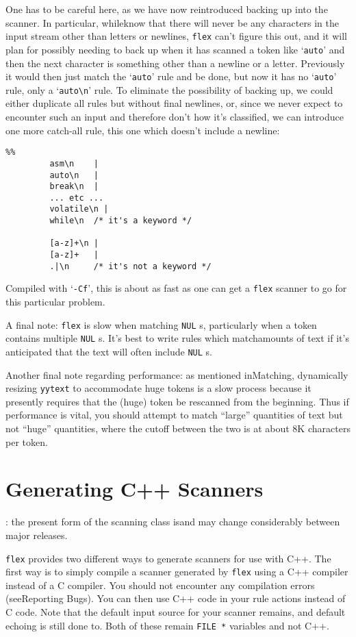 \documentclass[openany,oneside]{book}
\begin{document}
One has to be careful here, as we have now reintroduced backing up
into the scanner.  In particular, whileknow that there will never be any characters in the input stream
other than letters or newlines, \verb`flex` can't figure this out, and it will plan for possibly needing to back up
when it has scanned a token like ‘\verb`auto`’ and then the next character
is something other than a newline or a letter.  Previously it would
then just match the ‘\verb`auto`’ rule and be done, but now it has no ‘\verb`auto`’
rule, only a ‘\verb`auto\n`’ rule.  To eliminate the possibility of backing up,
we could either duplicate all rules but without final newlines, or,
since we never expect to encounter such an input and therefore don't
how it's classified, we can introduce one more catch-all rule, this
one which doesn't include a newline:
\begin{verbatim}
%%
         asm\n    |
         auto\n   |
         break\n  |
         ... etc ...
         volatile\n |
         while\n  /* it's a keyword */
     
         [a-z]+\n |
         [a-z]+   |
         .|\n     /* it's not a keyword */
\end{verbatim}


Compiled with ‘\verb`-Cf`’, this is about as fast as one can get a \verb`flex` scanner to go for this particular problem.

A final note: \verb`flex` is slow when matching \verb`NUL` s,
particularly when a token contains multiple \verb`NUL` s.  It's best to
write rules which matchamounts of text if it's anticipated
that the text will often include \verb`NUL` s.

Another final note regarding performance: as mentioned inMatching, dynamically resizing \verb`yytext` to accommodate huge
tokens is a slow process because it presently requires that the (huge)
token be rescanned from the beginning.  Thus if performance is vital,
you should attempt to match “large” quantities of text but not
“huge” quantities, where the cutoff between the two is at about 8K
characters per token.
\chapter{Generating C++ Scanners}


: the present form of the scanning class isand may change considerably between major releases.

 \verb`flex` provides two different ways to generate scanners for use
with C++.  The first way is to simply compile a scanner generated by \verb`flex` using a C++ compiler instead of a C compiler.  You should
not encounter any compilation errors (seeReporting Bugs).  You can
then use C++ code in your rule actions instead of C code.  Note that the
default input source for your scanner remains, and default
echoing is still done to.  Both of these remain \verb`FILE *` variables and not C++.
\end{document}
